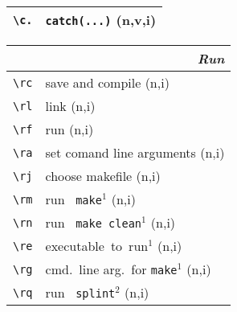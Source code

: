 \documentclass[oneside,11pt,landscape,DIV16]{scrartcl}
\begin{document}
\begin{multicols}{3}
\begin{center}
\begin{tabular}[]{|p{12mm}|p{60mm}|}
\hline \verb'\c.'   & \verb'catch(...)'                       \hfill (n,v,i) \\
\hline 
\end{tabular}
\vspace{100mm}
\begin{tabular}[]{|p{12mm}|p{58mm}|}
\hline
\multicolumn{2}{|r|}{\textsl{\textbf{R}un}} \\
\hline \verb'\rc'     & save and compile                        \hfill (n,i)       \\
\hline \verb'\rl'     & link                                    \hfill (n,i)       \\
\hline \verb'\rf'     & run                                     \hfill (n,i)       \\
\hline \verb'\ra'     & set comand line arguments               \hfill (n,i)       \\
\hline \verb'\rj'     & choose makefile                      \hfill (n,i)   \\
\hline \verb'\rm'     & run \texttt{ make}$^1$                      \hfill (n,i)   \\
\hline \verb'\rn'     & run \texttt{ make clean}$^1$                \hfill (n,i)   \\
\hline \verb'\re'     & executable\ to\ run$^1$                     \hfill (n,i)   \\
\hline \verb'\rg'     & cmd.\ line arg.\ for \texttt{make}$^1$      \hfill (n,i)   \\
%
\hline \verb'\rq'     & run \texttt{ splint}$^2$     \hfill (n,i)                  \\

\end{tabular}
\end{center}
\end{multicols}
\end{document}
